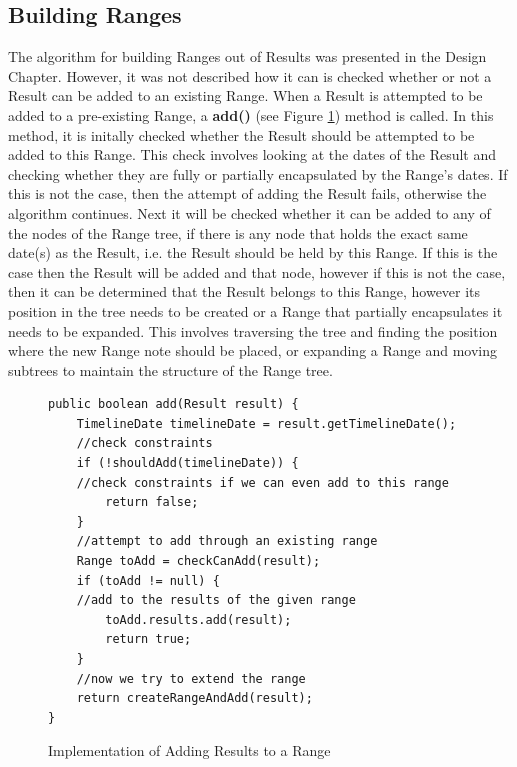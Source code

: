 \subsection{Building Ranges}
\par The algorithm for building Ranges out of Results was presented in the Design Chapter. However, it was not described how it can is checked whether or not a Result can be added to an existing Range. When a Result is attempted to be added to a pre-existing Range, a \textbf{add()} (see Figure \ref{fig:addRangeImplementation}) method is called. In this method, it is initally checked whether the Result should be attempted to be added to this Range. This check involves looking at the dates of the Result and checking whether they are fully or partially encapsulated by the Range's dates. If this is not the case, then the attempt of adding the Result fails, otherwise the algorithm continues. Next it will be checked whether it can be added to any of the nodes of the Range tree, if there is any node that holds the exact same date(s) as the Result, i.e. the Result should be held by this Range. If this is the case then the Result will be added and that node, however if this is not the case, then it can be determined that the Result belongs to this Range, however its position in the tree needs to be created or a Range that partially encapsulates it needs to be expanded. This involves traversing the tree and finding the position where the new Range note should be placed, or expanding a Range and moving subtrees to maintain the structure of the Range tree.
\begin{figure}[h]
\begin{lstlisting}
public boolean add(Result result) {
    TimelineDate timelineDate = result.getTimelineDate();
    //check constraints
    if (!shouldAdd(timelineDate)) {
	//check constraints if we can even add to this range
        return false;
    }
    //attempt to add through an existing range
    Range toAdd = checkCanAdd(result);
    if (toAdd != null) {
	//add to the results of the given range
        toAdd.results.add(result);
        return true;
    }
    //now we try to extend the range
    return createRangeAndAdd(result);
}
\end{lstlisting}
\caption{Implementation of Adding Results to a Range}
\label{fig:addRangeImplementation}
\end{figure}
